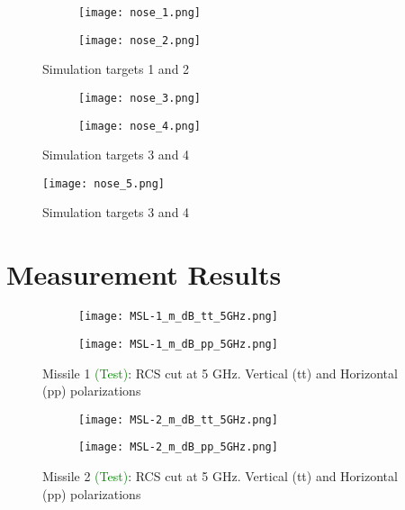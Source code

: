   \begin{figure}[htbp]
    \centering
    \begin{subfigure}{.5\textwidth}
      \centering
      \texttt{[image: nose\_1.png]}
    \end{subfigure}%
    \begin{subfigure}{.5\textwidth}
      \centering
      \texttt{[image: nose\_2.png]}
    \end{subfigure}
    \caption{Simulation targets 1 and 2}
    \label{fig:nose_1_2}
  \end{figure}

  \begin{figure}[htbp]
    \centering
    \begin{subfigure}{.5\textwidth}
      \centering
      \texttt{[image: nose\_3.png]}
    \end{subfigure}%
    \begin{subfigure}{.5\textwidth}
      \centering
      \texttt{[image: nose\_4.png]}
    \end{subfigure}
    \caption{Simulation targets 3 and 4}
    \label{fig:nose_3_4}
  \end{figure}

  \begin{figure}[htbp]
    \centering
    \texttt{[image: nose\_5.png]}
    \caption{Simulation targets 3 and 4}
    \label{fig:nose_5}
  \end{figure}

\chapter{Measurement Results}
\label{app:measurement_results}
  \begin{figure}[htbp]
    \centering
    \begin{subfigure}{.5\textwidth}
      \centering
      \texttt{[image: MSL-1\_m\_dB\_tt\_5GHz.png]}
    \end{subfigure}%
    \begin{subfigure}{.5\textwidth}
      \centering
      \texttt{[image: MSL-1\_m\_dB\_pp\_5GHz.png]}
    \end{subfigure}
    \caption{Missile 1 \textcolor{green}{(Test)}:  RCS cut at 5 GHz. Vertical (tt) and Horizontal (pp) polarizations }
    \label{fig:n1}
  \end{figure}

  \begin{figure}[htbp]
    \centering
    \begin{subfigure}{.5\textwidth}
      \centering
      \texttt{[image: MSL-2\_m\_dB\_tt\_5GHz.png]}
    \end{subfigure}%
    \begin{subfigure}{.5\textwidth}
      \centering
      \texttt{[image: MSL-2\_m\_dB\_pp\_5GHz.png]}
    \end{subfigure}
    \caption{Missile 2 \textcolor{green}{(Test)}:  RCS cut at 5 GHz. Vertical (tt) and Horizontal (pp) polarizations }
    \label{fig:n2}
  \end{figure}

